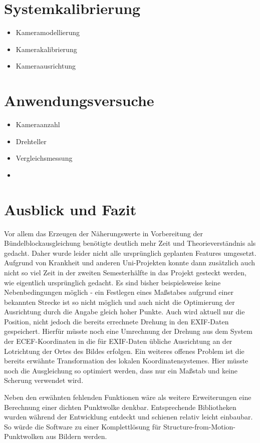 \documentclass[a4paper,12pt,bibliography=totoc, listof=totoc,titlepage]{scrreprt}
\begin{document}
\chapter{Systemkalibrierung}
\begin{itemize}
    \item Kameramodellierung
    \item Kamerakalibrierung
    \item Kameraausrichtung
\end{itemize}

\chapter{Anwendungsversuche}
\begin{itemize}
    \item Kameraanzahl
    \item Drehteller
    \item Vergleichsmessung
    \item
\end{itemize}

\chapter{Ausblick und Fazit}
Vor allem das Erzeugen der Näherungswerte in Vorbereitung der Bündelblockausgleich\-ung benötigte deutlich mehr Zeit und Theorieverständnis als gedacht. Daher wurde leider nicht alle ursprünglich geplanten Features umgesetzt. Aufgrund von Krankheit und anderen Uni-Projekten konnte dann zusätzlich auch nicht so viel Zeit in der zweiten Semesterhälfte in das Projekt gesteckt werden, wie eigentlich ursprünglich gedacht. Es sind bisher beispielsweise keine Nebenbedingungen möglich - ein Festlegen eines Maßstabes aufgrund einer bekannten Strecke ist so nicht möglich und auch nicht die Optimierung der Ausrichtung durch die Angabe gleich hoher Punkte. Auch wird aktuell nur die Position, nicht jedoch die bereits errechnete Drehung in den EXIF-Daten gespeichert. Hierfür müsste noch eine Umrechnung der Drehung aus dem System der ECEF-Koordinaten in die für EXIF-Daten übliche Ausrichtung an der Lotrichtung der Ortes des Bildes erfolgen. Ein weiteres offenes Problem ist die bereits erwähnte Transformation des lokalen Koordinatensystemes. Hier müsste noch die Ausgleichung so optimiert werden, dass nur ein Maßstab und keine Scherung verwendet wird.

Neben den erwähnten fehlenden Funktionen wäre als weitere Erweiterungen eine Berechnung einer dichten Punktwolke denkbar. Entsprechende Bibliotheken wurden währ\-end der Entwicklung entdeckt und schienen relativ leicht einbaubar. So würde die Software zu einer Komplettlösung für Structure-from-Motion-Punktwolken aus Bildern werden.
\end{document}
